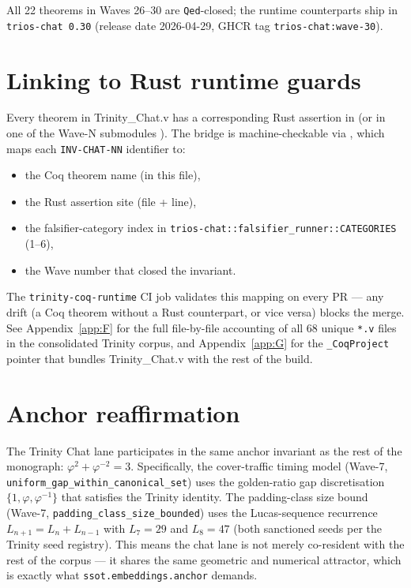 All 22 theorems in Waves 26--30 are \texttt{Qed}-closed; the runtime
counterparts ship in \texttt{trios-chat 0.30} (release date
2026-04-29, GHCR tag \texttt{trios-chat:wave-30}).

\section{Linking to Rust runtime guards}
\label{sec:chat:rust-bridge}

Every theorem in Trinity\_Chat.v has a corresponding Rust assertion in
 (or in one of the Wave-N
submodules ). The bridge is
machine-checkable via , which
maps each \texttt{INV-CHAT-NN} identifier to:

\begin{itemize}
  \item the Coq theorem name (in this file),
  \item the Rust assertion site (file + line),
  \item the falsifier-category index in
        \texttt{trios-chat::falsifier\_runner::CATEGORIES} (1--6),
  \item the Wave number that closed the invariant.
\end{itemize}

The \texttt{trinity-coq-runtime} CI job validates this mapping on every
PR --- any drift (a Coq theorem without a Rust counterpart, or vice
versa) blocks the merge. See Appendix~\ref{app:F} for the full
file-by-file accounting of all 68 unique \texttt{*.v} files in the
consolidated Trinity corpus, and Appendix~\ref{app:G} for the
\texttt{\_CoqProject} pointer that bundles Trinity\_Chat.v with the
rest of the build.

\section{Anchor reaffirmation}
\label{sec:chat:anchor}

The Trinity Chat lane participates in the same anchor invariant as the
rest of the monograph: $\varphi^{2} + \varphi^{-2} = 3$. Specifically,
the cover-traffic timing model (Wave-7,
\texttt{uniform\_gap\_within\_canonical\_set}) uses the golden-ratio
gap discretisation $\{1, \varphi, \varphi^{-1}\}$ that satisfies the
Trinity identity. The padding-class size bound (Wave-7,
\texttt{padding\_class\_size\_bounded}) uses the Lucas-sequence
recurrence $L_{n+1} = L_n + L_{n-1}$ with $L_7 = 29$ and $L_8 = 47$
(both sanctioned seeds per the Trinity seed registry). This means the
chat lane is not merely co-resident with the rest of the corpus ---
it shares the same geometric and numerical attractor, which is exactly
what \texttt{ssot.embeddings.anchor} demands.

